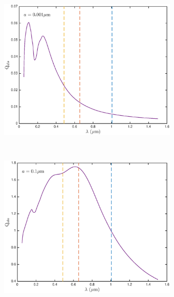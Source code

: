 \begin{figure}
\begin{subfigure}{\textwidth}
\centering
\includegraphics[trim =30 30 45 25,clip=true,scale=0.55]{chapters/chapter4/images/Qabs_a0_001}
\end{subfigure} \\[0.5ex]

\begin{subfigure}{\textwidth}
\centering

\includegraphics[trim =30 30 45 25,clip=true,scale=0.55]{chapters/chapter4/images/Qabs_a0_1} 
\end{subfigure} \\[0.5ex]


\end{figure}
